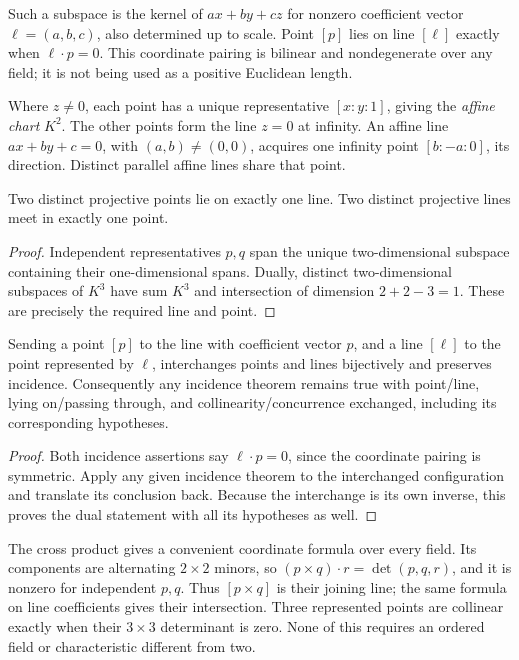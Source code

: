 Such a subspace is the kernel of $ax+by+cz$ for nonzero coefficient vector $\ell=(a,b,c)$, also determined up to scale. Point $[p]$ lies on line $[\ell]$ exactly when $\ell\cdot p=0$. This coordinate pairing is bilinear and nondegenerate over any field; it is not being used as a positive Euclidean length.

Where $z\ne0$, each point has a unique representative $[x:y:1]$, giving the \emph{affine chart} $K^2$. The other points form the line $z=0$ at infinity. An affine line $ax+by+c=0$, with $(a,b)\ne(0,0)$, acquires one infinity point $[b:-a:0]$, its direction. Distinct parallel affine lines share that point.

\begin{proposition}\label{geometry:prop:incidence}
Two distinct projective points lie on exactly one line. Two distinct projective lines meet in exactly one point.
\end{proposition}
\begin{proof}
Independent representatives $p,q$ span the unique two-dimensional subspace containing their one-dimensional spans. Dually, distinct two-dimensional subspaces of $K^3$ have sum $K^3$ and intersection of dimension $2+2-3=1$. These are precisely the required line and point.
\end{proof}

\begin{theorem}[Duality]\label{geometry:thm:duality}
Sending a point $[p]$ to the line with coefficient vector $p$, and a line $[\ell]$ to the point represented by $\ell$, interchanges points and lines bijectively and preserves incidence. Consequently any incidence theorem remains true with point/line, lying on/passing through, and collinearity/concurrence exchanged, including its corresponding hypotheses.
\end{theorem}
\begin{proof}
Both incidence assertions say $\ell\cdot p=0$, since the coordinate pairing is symmetric. Apply any given incidence theorem to the interchanged configuration and translate its conclusion back. Because the interchange is its own inverse, this proves the dual statement with all its hypotheses as well.
\end{proof}

The cross product gives a convenient coordinate formula over every field. Its components are alternating $2\times2$ minors, so $(p\times q)\cdot r=\det(p,q,r)$, and it is nonzero for independent $p,q$. Thus $[p\times q]$ is their joining line; the same formula on line coefficients gives their intersection. Three represented points are collinear exactly when their $3\times3$ determinant is zero. None of this requires an ordered field or characteristic different from two.

